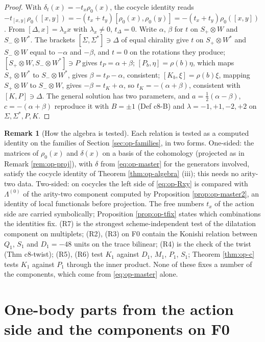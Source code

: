 \documentclass[11pt]{article}
\numberwithin{equation}{section}
\theoremstyle{plain}
\theoremstyle{definition}
\newtheorem{remark}[theorem]{Remark}
\begin{document}
\begin{proof}
With $\delta_t(x)=-t_x\rho_0(x)$, the cocycle identity reads $-t_{[x,y]}\rho_0([x,y])=-(t_x+t_y)[\rho_0(x),\rho_0(y)]=-(t_x+t_y)\rho_0([x,y])$. From $[\Delta,x]=\lambda_xx$ with $\lambda_x\ne0$, $t_\Delta=0$. Write $\alpha$, $\beta$ for $t$ on $S_+\otimes W$ and $S_-\otimes W^*$. The brackets $[\Sigma,\Sigma^*]\ni\Delta$ of equal chirality give $t$ on $S_+\otimes W^*$ and $S_-\otimes W$ equal to $-\alpha$ and $-\beta$, and $t=0$ on the rotations they produce; $[S_+\otimes W,S_-\otimes W^*]\ni P$ gives $t_P=\alpha+\beta$; $[P_b,\eta]=\rho(b)\eta$, which maps $S_+\otimes W^*$ to $S_-\otimes W^*$, gives $\beta=t_P-\alpha$, consistent; $[K_b,\xi]=\rho(b)\xi$, mapping $S_+\otimes W$ to $S_-\otimes W$, gives $-\beta=t_K+\alpha$, so $t_K=-(\alpha+\beta)$, consistent with $[K,P]\ni\Delta$. The general solution has two parameters, and $a=\tfrac12(\alpha-\beta)$, $c=-(\alpha+\beta)$ reproduce it with $B=\pm1$ (Def c8-B) and $\lambda=-1,+1,-2,+2$ on $\Sigma,\Sigma^*,P,K$.
\end{proof}

\begin{remark}[How the algebra is tested]
\label{rem:op-algtest}
Each relation is tested as a computed identity on the families of Section \ref{sec:op-families}, in two forms. One-sided: the matrices of $\rho_0(x)$ and $\delta(x)$ on a basis of the cohomology (projected as in Remark \ref{rem:op-proj}), with $\delta$ from \eqref{eq:op-master} for the generators involved, satisfy the cocycle identity of Theorem \ref{thm:op-algebra} (iii); this needs no arity-two data. Two-sided: on cocycles the left side of \eqref{eq:op-Rxy} is compared with $\Lambda^{(0)}$ of the arity-two component computed by Proposition \ref{prop:op-master2}, an identity of local functionals before projection. The free numbers $t_x$ of the action side are carried symbolically; Proposition \ref{prop:op-tfix} states which combinations the identities fix. (R7) is the strongest scheme-independent test of the dilatation component on multiplets; (R2), (R3) on F0 contain the Konishi relation between $Q_1$, $S_1$ and $D_1=-48$ units on the trace bilinear; (R4) is the check of the twist (Thm c8-twist); (R5), (R6) test $K_1$ against $D_1$, $M_1$, $P_1$, $S_1$; Theorem \ref{thm:op-c} tests $K_1$ against $P_1$ through the inner product. None of these fixes a number of the components, which come from \eqref{eq:op-master} alone.
\end{remark}

\section{One-body parts from the action side and the components on F0}
\label{sec:op-F0}
\end{document}
